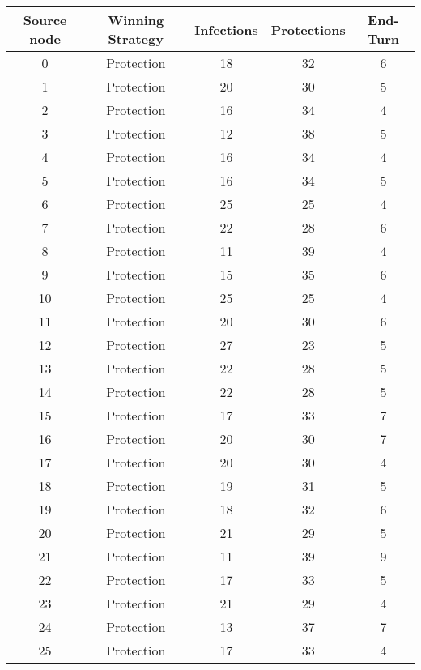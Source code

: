 \documentclass[results.tex]{subfiles}
\begin{document}
\begin{center}
  \begin{tabular}{| c || c | c | c | c |}
    \hline
    {\bfseries Source node} & {\bfseries Winning Strategy} & {\bfseries Infections} & {\bfseries Protections} & {\bfseries End-Turn} \\  %
    \hline\hline
    0 & Protection & 18 & 32 & 6 \\ 
    \hline
    1 & Protection & 20 & 30 & 5 \\ 
    \hline
    2 & Protection & 16 & 34 & 4 \\ 
    \hline
    3 & Protection & 12 & 38 & 5 \\ 
    \hline
    4 & Protection & 16 & 34 & 4 \\ 
    \hline
    5 & Protection & 16 & 34 & 5 \\ 
    \hline
    6 & Protection & 25 & 25 & 4 \\ 
    \hline
    7 & Protection & 22 & 28 & 6 \\ 
    \hline
    8 & Protection & 11 & 39 & 4 \\ 
    \hline
    9 & Protection & 15 & 35 & 6 \\ 
    \hline
    10 & Protection & 25 & 25 & 4 \\ 
    \hline
    11 & Protection & 20 & 30 & 6 \\ 
    \hline
    12 & Protection & 27 & 23 & 5 \\ 
    \hline
    13 & Protection & 22 & 28 & 5 \\ 
    \hline
    14 & Protection & 22 & 28 & 5 \\ 
    \hline
    15 & Protection & 17 & 33 & 7 \\ 
    \hline
    16 & Protection & 20 & 30 & 7 \\ 
    \hline
    17 & Protection & 20 & 30 & 4 \\ 
    \hline
    18 & Protection & 19 & 31 & 5 \\ 
    \hline
    19 & Protection & 18 & 32 & 6 \\ 
    \hline
    20 & Protection & 21 & 29 & 5 \\ 
    \hline
    21 & Protection & 11 & 39 & 9 \\ 
    \hline
    22 & Protection & 17 & 33 & 5 \\ 
    \hline
    23 & Protection & 21 & 29 & 4 \\ 
    \hline
    24 & Protection & 13 & 37 & 7 \\ 
    \hline
    25 & Protection & 17 & 33 & 4 \\ 

\end{tabular}
\end{center}
\end{document}
